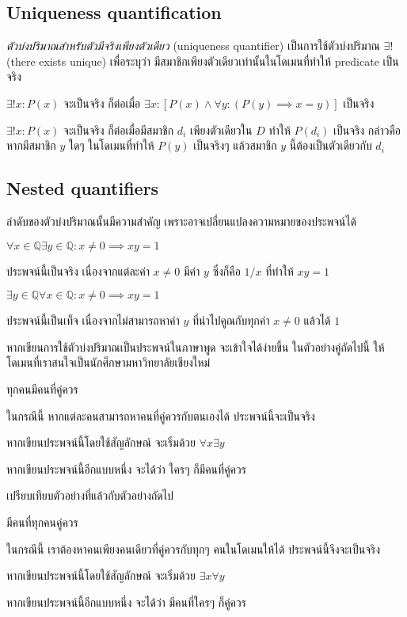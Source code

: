 \subsection{Uniqueness quantification}
\emph{ตัวบ่งปริมาณสำหรับตัวมีจริงเพียงตัวเดียว} (uniqueness quantifier) เป็นการใช้ตัวบ่งปริมาณ $\exists!$ (there exists unique) เพื่อระบุว่า มีสมาชิกเพียงตัวเดียวเท่านั้นในโดเมนที่ทำให้ predicate เป็นจริง

\begin{definition}
$\exists! x: P(x)$ จะเป็นจริง ก็ต่อเมื่อ $\exists x: \left[P(x)\wedge \forall y: (P(y)\implies x=y)\right]$ เป็นจริง
\end{definition}
$\exists! x: P(x)$ จะเป็นจริง ก็ต่อเมื่อมีสมาชิก $d_i$ เพียงตัวเดียวใน $D$ ทำให้ $P(d_i)$ เป็นจริง กล่าวคือ หากมีสมาชิก $y$ ใดๆ ในโดเมนที่ทำให้ $P(y)$ เป็นจริงๆ แล้วสมาชิก $y$ นี้ต้องเป็นตัวเดียวกับ $d_i$

\subsection{Nested quantifiers}
ลำดับของตัวบ่งปริมาณนั้นมีความสำคัญ เพราะอาจเปลี่ยนแปลงความหมายของประพจน์ได้
\begin{example}
$\forall x\in\mathbb{Q}\exists y\in\mathbb{Q}: x\neq 0\implies xy=1$

ประพจน์นี้เป็นจริง เนื่องจากแต่ละค่า $x\neq 0$ มีค่า $y$ ซึ่งก็คือ $1/x$ ที่ทำให้ $xy=1$
\end{example}

\begin{example}
$\exists y\in\mathbb{Q}\forall x\in\mathbb{Q}: x\neq 0\implies xy=1$

ประพจน์นี้เป็นเท็จ เนื่องจากไม่สามารถหาค่า $y$ ที่นำไปคูณกับทุกค่า $x\neq 0$ แล้วได้ $1$
\end{example}

หากเขียนการใช้ตัวบ่งปริมาณเป็นประพจน์ในภาษาพูด จะเข้าใจได้ง่ายขึ้น \enskip ในตัวอย่างคู่ถัดไปนี้ ให้โดเมนที่เราสนใจเป็นนักศึกษามหาวิทยาลัยเชียงใหม่
\begin{example}
ทุกคนมีคนที่คู่ควร

ในกรณีนี้ หากแต่ละคนสามารถหาคนที่คู่ควรกับตนเองได้ ประพจน์นี้จะเป็นจริง

หากเขียนประพจน์นี้โดยใช้สัญลักษณ์ จะเริ่มด้วย $\forall x\exists y$

หากเขียนประพจน์นี้อีกแบบหนึ่ง จะได้ว่า ใครๆ ก็มีคนที่คู่ควร
\end{example}
เปรียบเทียบตัวอย่างที่แล้วกับตัวอย่างถัดไป
\begin{example}
มีคนที่ทุกคนคู่ควร

ในกรณีนี้ เราต้องหาคนเพียงคนเดียวที่คู่ควรกับทุกๆ คนในโดเมนให้ได้ ประพจน์นี้จึงจะเป็นจริง

หากเขียนประพจน์นี้โดยใช้สัญลักษณ์ จะเริ่มด้วย $\exists x\forall y$

หากเขียนประพจน์นี้อีกแบบหนึ่ง จะได้ว่า มีคนที่ใครๆ ก็คู่ควร
\end{example}

